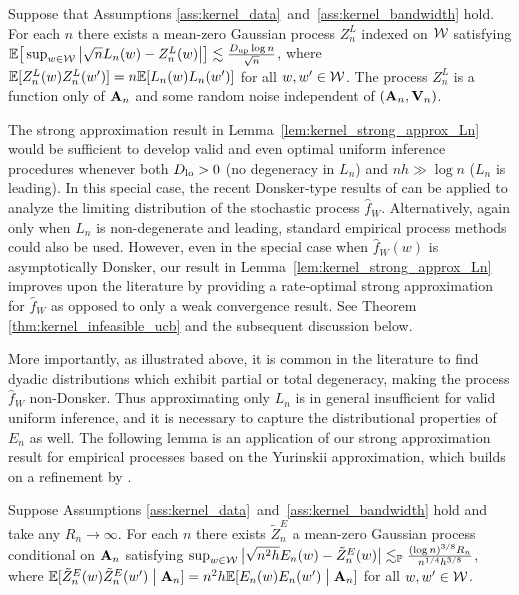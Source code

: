 \begin{lemma}
  \label{lem:kernel_strong_approx_Ln}
  Suppose that Assumptions \ref{ass:kernel_data}~and~\ref{ass:kernel_bandwidth}
  hold. For each $n$ there exists a mean-zero Gaussian process $Z^L_n$ indexed
  on $\mathcal{W}$ satisfying
  $\mathbb{E}\big[ \sup_{w \in \mathcal{W}} \big| \sqrt{n} L_n(w) - Z_n^L(w) \big| \big]
  \lesssim \frac{D_{\textup{up}} \log n}{\sqrt{n}}$, where
  $\mathbb{E}[Z_n^L(w)Z_n^L(w')] =  n\mathbb{E}[L_n(w)L_n(w')]$ for all $w, w' \in \mathcal{W}$. The
  process $Z_n^L$ is a function only of $\mathbf{A}_n$ and some random noise
  independent of $(\mathbf{A}_n, \mathbf{V}_n)$.
\end{lemma}

The strong approximation result in Lemma~\ref{lem:kernel_strong_approx_Ln}
would be
sufficient to develop valid and even optimal uniform inference procedures
whenever both $D_{\textup{lo}} > 0$ (no degeneracy in $L_n$) and $n h \gg \log n$
($L_n$ is leading). In this special case, the recent Donsker-type results of
\citet{davezies2021exchangeable} can be applied to analyze the limiting
distribution of the stochastic process $\hat{f}_W$. Alternatively, again only
when $L_n$ is non-degenerate and leading, standard empirical process methods
could also be used. However, even in the special case when $\hat{f}_W(w)$ is
asymptotically Donsker, our result in Lemma~\ref{lem:kernel_strong_approx_Ln}
improves
upon the literature by providing a rate-optimal strong approximation for
$\hat{f}_W$ as opposed to only a weak convergence result. See Theorem
\ref{thm:kernel_infeasible_ucb} and the subsequent discussion below.

More importantly, as illustrated above, it is common in the literature to find
dyadic distributions which exhibit partial or total degeneracy, making the
process $\hat{f}_W$ non-Donsker. Thus approximating only $L_n$ is in general
insufficient for valid uniform inference, and it is necessary to capture the
distributional properties of $E_n$ as well.
The following lemma is an application of our strong approximation result for
empirical processes based on the Yurinskii approximation, which builds on a
refinement by \citet{belloni2019conditional}.

\begin{lemma}
  \label{lem:kernel_conditional_strong_approx_En}
  Suppose Assumptions \ref{ass:kernel_data}~and~\ref{ass:kernel_bandwidth} hold
  and take any $R_n \to \infty$. For each $n$ there exists $\tilde Z^E_n$
  a mean-zero Gaussian process conditional on $\mathbf{A}_n$ satisfying
  $\sup_{w \in \mathcal{W}}
  \big| \sqrt{n^2h} E_n(w) - \tilde Z_n^E(w) \big|
  \lesssim_{\mathbb{P}} \frac{(\log n)^{3/8} R_n}{n^{1/4}h^{3/8}}$,
  where $\mathbb{E}[\tilde Z_n^E(w)\tilde Z_n^E(w')\bigm\vert \mathbf{A}_n]
  =n^2h\mathbb{E}[E_n(w)E_n(w')\bigm\vert \mathbf{A}_n]$
  for all $w, w' \in \mathcal{W}$.
\end{lemma}

